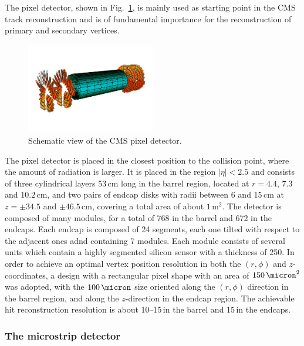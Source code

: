 The pixel detector, shown in Fig.~\ref{fig:pixel}, is mainly used as starting point in the CMS track reconstruction and is of fundamental importance for the reconstruction of primary and secondary vertices. 
\begin{figure}[htb]
\centering
\includegraphics[width=0.5\textwidth]{images/pixel.png}
\caption{Schematic view of the CMS pixel detector.}\label{fig:pixel}
\end{figure}
The pixel detector is placed in the closest position to the collision point, where the amount of radiation is larger. It is placed in the region $|\eta|<2.5$ and consists of three cylindrical layers 53\,cm long in the barrel region, located at $r=4.4$, $7.3$ and $10.2$\,cm, and two pairs of endcap disks with radii between 6 and 15\,cm at $z=\pm34.5$ and $\pm46.5$\,cm, covering a total area of about $1\,\mathrm{m^2}$. The detector is composed of many modules, for a total of 768 in the barrel and 672 in the endcaps. Each endcap is composed of 24 segments, each one tilted with respect to the adjacent ones adnd containing 7 modules. Each module consists of several units which contain a highly segmented silicon sensor with a thickness of 250\micron. In order to achieve an optimal vertex position resolution in both the $(r,\phi)$ and $z$-coordinates, a design with a rectangular pixel shape with an area of $150\time100\,\micron^2$ was adopted, with the $100\,\micron$ size oriented along the $(r,\phi)$ direction in the barrel region, and along the $z$-direction in the endcap region. The achievable hit reconstruction resolution is about 10--15\,\micron in the barrel and 15\,\micron in the endcaps.

\subsubsection{The microstrip detector}

